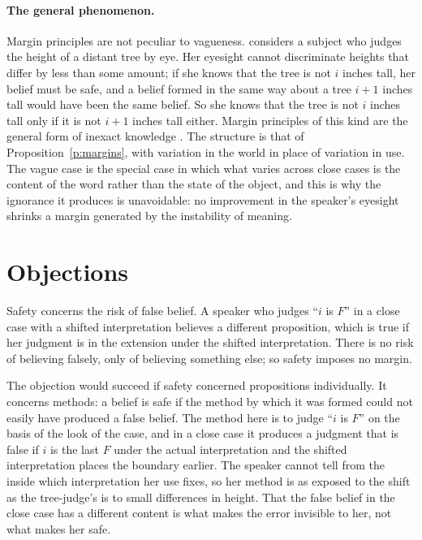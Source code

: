 \documentclass{situationist-preprint}
\begin{document}
\paragraph{The general phenomenon.} Margin principles are not peculiar to vagueness. \citet[ch.~5]{Williamson2000} considers a subject who judges the height of a distant tree by eye. Her eyesight cannot discriminate heights that differ by less than some amount; if she knows that the tree is not $i$ inches tall, her belief must be safe, and a belief formed in the same way about a tree $i+1$ inches tall would have been the same belief. So she knows that the tree is not $i$ inches tall only if it is not $i+1$ inches tall either. Margin principles of this kind are the general form of inexact knowledge \citep{Williamson1992}. The structure is that of Proposition~\ref{p:margins}, with variation in the world in place of variation in use. The vague case is the special case in which what varies across close cases is the content of the word rather than the state of the object, and this is why the ignorance it produces is unavoidable: no improvement in the speaker's eyesight shrinks a margin generated by the instability of meaning.

\section{Objections}\label{s:obj}

\begin{objection}\label{o:risk}
Safety concerns the risk of false belief. A speaker who judges \enquote{$i$ is $F$} in a close case with a shifted interpretation believes a different proposition, which is true if her judgment is in the extension under the shifted interpretation. There is no risk of believing falsely, only of believing something else; so safety imposes no margin.
\end{objection}

\begin{reply}
The objection would succeed if safety concerned propositions individually. It concerns methods: a belief is safe if the method by which it was formed could not easily have produced a false belief. The method here is to judge \enquote{$i$ is $F$} on the basis of the look of the case, and in a close case it produces a judgment that is false if $i$ is the last $F$ under the actual interpretation and the shifted interpretation places the boundary earlier. The speaker cannot tell from the inside which interpretation her use fixes, so her method is as exposed to the shift as the tree-judge's is to small differences in height. That the false belief in the close case has a different content is what makes the error invisible to her, not what makes her safe.
\end{reply}
\end{document}

